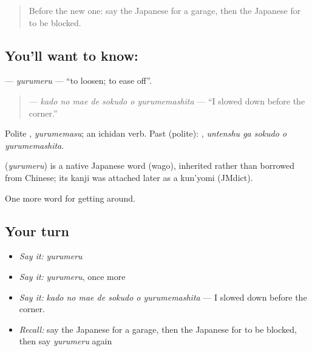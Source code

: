 \label{lesson:JA-C395-yurumeru}



\begin{quote}
Before the new one: say the Japanese for a garage, then the Japanese for to be blocked.
\end{quote}

\subsection*{You'll want to know: }
\textbf{} — \emph{yurumeru} — \textquotedblleft{}to loosen; to ease off\textquotedblright{}.

\begin{quote}
\textbf{   } — \emph{kado no mae de sokudo o yurumemashita} — \textquotedblleft{}I slowed down before the corner.\textquotedblright{}
\end{quote}

Polite \textbf{}, \emph{yurumemasu}; an ichidan verb. Past (polite): \textbf{  }, \emph{untenshu ga sokudo o yurumemashita}.

\begin{cousinweb}
\textbf{} (\emph{yurumeru}) is a native Japanese word (wago), inherited rather than borrowed from Chinese; its kanji was attached later as a kun'yomi (JMdict).
\end{cousinweb}

\begin{grammarlens}[title={What you've built}]
One more word for getting around.
\end{grammarlens}

\subsection*{Your turn}
\begin{itemize}
\raggedright
  \item \emph{Say it:} \emph{yurumeru}
  \item \emph{Say it:} \emph{yurumeru}, once more
  \item \emph{Say it:} \emph{kado no mae de sokudo o yurumemashita} — I slowed down before the corner.
  \item \emph{Recall:} say the Japanese for a garage, then the Japanese for to be blocked, then say \emph{yurumeru} again
\end{itemize}

